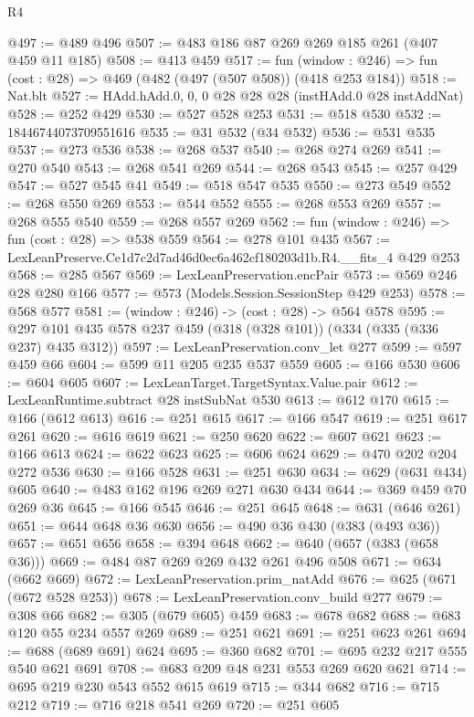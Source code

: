 \begin{lexlean}{R4}
\begin{coremodule}
@497 := @489 @496
@507 := @483 @186 @87 @269 @269 @185 @261 (@407 @459 @11 @185)
@508 := @413 @459
@517 := fun (window : @246) => fun (cost : @28) => @469 (@482 (@497 (@507 @508)) (@418 @253 @184))
@518 := Nat.blt
@527 := HAdd.hAdd.{0, 0, 0} @28 @28 @28 (instHAdd.{0} @28 instAddNat)
@528 := @252 @429
@530 := @527 @528 @253
@531 := @518 @530
@532 := 18446744073709551616
@535 := @31 @532 (@34 @532)
@536 := @531 @535
@537 := @273 @536
@538 := @268 @537
@540 := @268 @274 @269
@541 := @270 @540
@543 := @268 @541 @269
@544 := @268 @543
@545 := @257 @429
@547 := @527 @545 @41
@549 := @518 @547 @535
@550 := @273 @549
@552 := @268 @550 @269
@553 := @544 @552
@555 := @268 @553 @269
@557 := @268 @555 @540
@559 := @268 @557 @269
@562 := fun (window : @246) => fun (cost : @28) => @538 @559
@564 := @278 @101 @435
@567 := LexLeanPreserve.Ce1d7c2d7ad46d0ec6a462cf180203d1b.R4.__fits_4 @429 @253
@568 := @285 @567
@569 := LexLeanPreservation.encPair
@573 := @569 @246 @28 @280 @166
@577 := @573 (Models.Session.SessionStep @429 @253)
@578 := @568 @577
@581 := (window : @246) -> (cost : @28) -> @564 @578
@595 := @297 @101 @435 @578 @237 @459 (@318 (@328 @101)) (@334 (@335 (@336 @237) @435 @312))
@597 := LexLeanPreservation.conv_let @277
@599 := @597 @459 @66
@604 := @599 @11 @205 @235 @537 @559
@605 := @166 @530
@606 := @604 @605
@607 := LexLeanTarget.TargetSyntax.Value.pair
@612 := LexLeanRuntime.subtract @28 instSubNat @530
@613 := @612 @170
@615 := @166 (@612 @613)
@616 := @251 @615
@617 := @166 @547
@619 := @251 @617 @261
@620 := @616 @619
@621 := @250 @620
@622 := @607 @621
@623 := @166 @613
@624 := @622 @623
@625 := @606 @624
@629 := @470 @202 @204 @272 @536
@630 := @166 @528
@631 := @251 @630
@634 := @629 (@631 @434) @605
@640 := @483 @162 @196 @269 @271 @630 @434
@644 := @369 @459 @70 @269 @36
@645 := @166 @545
@646 := @251 @645
@648 := @631 (@646 @261)
@651 := @644 @648 @36 @630
@656 := @490 @36 @430 (@383 (@493 @36))
@657 := @651 @656
@658 := @394 @648
@662 := @640 (@657 (@383 (@658 @36)))
@669 := @484 @87 @269 @269 @432 @261 @496 @508
@671 := @634 (@662 @669)
@672 := LexLeanPreservation.prim_natAdd
@676 := @625 (@671 (@672 @528 @253))
@678 := LexLeanPreservation.conv_build @277
@679 := @308 @66
@682 := @305 (@679 @605) @459
@683 := @678 @682
@688 := @683 @120 @55 @234 @557 @269
@689 := @251 @621
@691 := @251 @623 @261
@694 := @688 (@689 @691) @624
@695 := @360 @682
@701 := @695 @232 @217 @555 @540 @621 @691
@708 := @683 @209 @48 @231 @553 @269 @620 @621
@714 := @695 @219 @230 @543 @552 @615 @619
@715 := @344 @682
@716 := @715 @212
@719 := @716 @218 @541 @269
@720 := @251 @605

\end{coremodule}
\end{lexlean}
